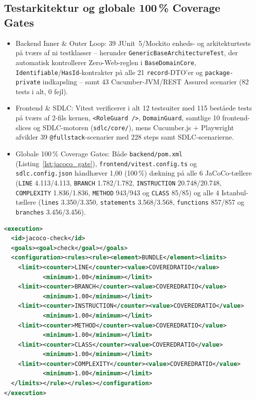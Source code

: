 \documentclass[11pt,a4paper]{article}
\begin{document}
\subsection{Testarkitektur og globale 100\,\% Coverage Gates}
\begin{itemize}[noitemsep]
    \item Backend Inner \& Outer Loop: 39 JUnit~5/Mockito enheds- og arkitekturtests på tværs af ni testklasser -- herunder \texttt{GenericBaseArchitectureTest}, der automatisk kontrollerer Zero-Web-reglen i \texttt{BaseDomainCore}, \texttt{Identifiable}/\texttt{HasId}-kontrakter på alle 21 \texttt{record}-DTO'er og \texttt{package-private} indkapsling -- samt 43 Cucumber-JVM/REST Assured scenarier (82 tests i alt, 0 fejl).
    \item Frontend \& SDLC: Vitest verificerer i alt 12 testsuiter med 115 beståede tests på tværs af 2-fils kernen, \texttt{<RoleGuard />}, \texttt{DomainGuard}, samtlige 10 frontend-slices og SDLC-motoren (\texttt{sdlc/core/}), mens Cucumber.js + Playwright afvikler 39 \texttt{@fullstack}-scenarier med 228 steps samt SDLC-scenarierne.
    \item Globale 100\,\% Coverage Gates: Både \texttt{backend/pom.xml} (Listing~\ref{lst:jacoco_gate}), \texttt{frontend/\allowbreak vitest.config.ts} og \texttt{sdlc.config.json} håndhæver 1,00 (100\,\%) dækning på alle 6 JaCoCo-tællere (\texttt{LINE} 4.113/4.113, \texttt{BRANCH} 1.782/1.782, \texttt{INSTRUCTION} 20.748/20.748, \texttt{COMPLEXITY} 1.836/1.836, \texttt{METHOD} 943/943 og \texttt{CLASS} 85/85) og alle 4 Istanbul-tællere (\texttt{lines} 3.350/3.350, \texttt{statements} 3.568/3.568, \texttt{functions} 857/857 og \texttt{branches} 3.456/3.456).
\end{itemize}

\begin{lstlisting}[language=XML, caption={Global 100\,\% JaCoCo Coverage Gate i \texttt{backend/pom.xml}.}, label={lst:jacoco_gate}]
<execution>
  <id>jacoco-check</id>
  <goals><goal>check</goal></goals>
  <configuration><rules><rule><element>BUNDLE</element><limits>
    <limit><counter>LINE</counter><value>COVEREDRATIO</value>
           <minimum>1.00</minimum></limit>
    <limit><counter>BRANCH</counter><value>COVEREDRATIO</value>
           <minimum>1.00</minimum></limit>
    <limit><counter>INSTRUCTION</counter><value>COVEREDRATIO</value>
           <minimum>1.00</minimum></limit>
    <limit><counter>METHOD</counter><value>COVEREDRATIO</value>
           <minimum>1.00</minimum></limit>
    <limit><counter>CLASS</counter><value>COVEREDRATIO</value>
           <minimum>1.00</minimum></limit>
    <limit><counter>COMPLEXITY</counter><value>COVEREDRATIO</value>
           <minimum>1.00</minimum></limit>
  </limits></rule></rules></configuration>
</execution>
\end{lstlisting}
\end{document}
